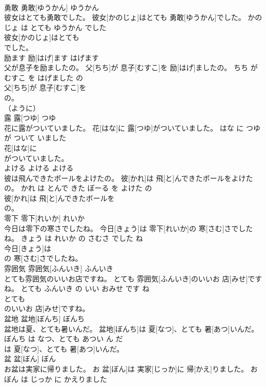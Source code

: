 \documentclass[8pt]{extreport}
\begin{document}
\begin{CJK}{UTF8}{min}
\\	勇敢	勇敢[ゆうかん]	ゆうかん	
\\	彼女はとても勇敢でした。	彼女[かのじょ]はとても 勇敢[ゆうかん]でした。	かのじょ は とても ゆうかん でした	
\\	彼女[かのじょ]はとても
\\	でした。			
\\	励ます	励[はげ]ます	はげます	
\\	父が息子を励ましたの。	父[ちち]が 息子[むすこ]を 励[はげ]ましたの。	ちち が むすこ を はげました の	
\\	父[ちち]が 息子[むすこ]を
\\	の。			
\\	（ように）	
\\	露	露[つゆ]	つゆ	
\\	花に露がついていました。	花[はな]に 露[つゆ]がついていました。	はな に つゆ が ついて いました	
\\	花[はな]に
\\	がついていました。			
\\	よける	よける	よける	
\\	彼は飛んできたボールをよけたの。	彼[かれ]は 飛[と]んできたボールをよけたの。	かれ は とんで きた ぼーる を よけた の	
\\	彼[かれ]は 飛[と]んできたボールを
\\	の。			
\\	零下	零下[れいか]	れいか	
\\	今日は零下の寒さでしたね。	今日[きょう]は 零下[れいか]の 寒[さむ]さでしたね。	きょう は れいか の さむさ でした ね	
\\	今日[きょう]は
\\	の 寒[さむ]さでしたね。			
\\	雰囲気	雰囲気[ふんいき]	ふんいき	
\\	とても雰囲気のいいお店ですね。	とても 雰囲気[ふんいき]のいいお 店[みせ]ですね。	とても ふんいき の いい おみせ です ね	
\\	とても
\\	のいいお 店[みせ]ですね。			
\\	盆地	盆地[ぼんち]	ぼんち	
\\	盆地は夏、とても暑いんだ。	盆地[ぼんち]は 夏[なつ]、とても 暑[あつ]いんだ。	ぼんち は なつ、とても あつい ん だ	
\\	は 夏[なつ]、とても 暑[あつ]いんだ。			
\\	盆	盆[ぼん]	ぼん	
\\	お盆は実家に帰りました。	お 盆[ぼん]は 実家[じっか]に 帰[かえ]りました。	お ぼん は じっか に かえりました	

\end{CJK}
\end{document}
